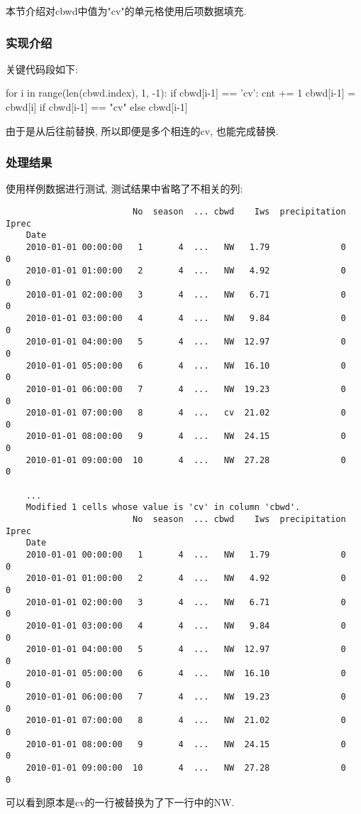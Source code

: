 本节介绍对cbwd中值为"cv"的单元格使用后项数据填充.

\subsubsection{实现介绍}
关键代码段如下:
\begin{python}
    for i in range(len(cbwd.index), 1, -1):
        if cbwd[i-1] == 'cv':
            cnt += 1
        cbwd[i-1] = cbwd[i] if cbwd[i-1] == "cv" else cbwd[i-1]
\end{python}
由于是从后往前替换, 所以即便是多个相连的cv, 也能完成替换.

\subsubsection{处理结果}
使用样例数据进行测试, 测试结果中省略了不相关的列:
\begin{lstlisting}
                         No  season  ... cbwd    Iws  precipitation  Iprec
    Date
    2010-01-01 00:00:00   1       4  ...   NW   1.79              0      0
    2010-01-01 01:00:00   2       4  ...   NW   4.92              0      0
    2010-01-01 02:00:00   3       4  ...   NW   6.71              0      0
    2010-01-01 03:00:00   4       4  ...   NW   9.84              0      0
    2010-01-01 04:00:00   5       4  ...   NW  12.97              0      0
    2010-01-01 05:00:00   6       4  ...   NW  16.10              0      0
    2010-01-01 06:00:00   7       4  ...   NW  19.23              0      0
    2010-01-01 07:00:00   8       4  ...   cv  21.02              0      0
    2010-01-01 08:00:00   9       4  ...   NW  24.15              0      0
    2010-01-01 09:00:00  10       4  ...   NW  27.28              0      0
    
    ...
    Modified 1 cells whose value is 'cv' in column 'cbwd'.
                         No  season  ... cbwd    Iws  precipitation  Iprec
    Date
    2010-01-01 00:00:00   1       4  ...   NW   1.79              0      0
    2010-01-01 01:00:00   2       4  ...   NW   4.92              0      0
    2010-01-01 02:00:00   3       4  ...   NW   6.71              0      0
    2010-01-01 03:00:00   4       4  ...   NW   9.84              0      0
    2010-01-01 04:00:00   5       4  ...   NW  12.97              0      0
    2010-01-01 05:00:00   6       4  ...   NW  16.10              0      0
    2010-01-01 06:00:00   7       4  ...   NW  19.23              0      0
    2010-01-01 07:00:00   8       4  ...   NW  21.02              0      0
    2010-01-01 08:00:00   9       4  ...   NW  24.15              0      0
    2010-01-01 09:00:00  10       4  ...   NW  27.28              0      0
\end{lstlisting}
可以看到原本是cv的一行被替换为了下一行中的NW.